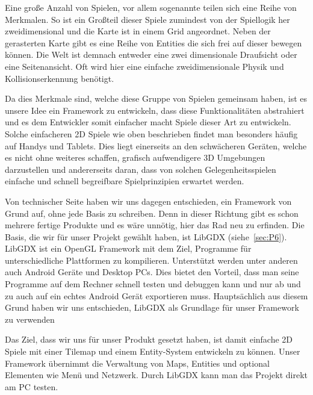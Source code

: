 Eine große Anzahl von Spielen, vor allem sogenannte  teilen sich eine Reihe von Merkmalen.
So ist ein Großteil dieser Spiele zumindest von der Spiellogik her zweidimensional und die Karte ist in einem Grid angeordnet. Neben der gerasterten Karte gibt es eine Reihe von Entities die sich frei auf dieser bewegen können. Die Welt ist demnach entweder eine zwei dimensionale Draufsicht oder eine Seitenansicht. Oft wird hier eine einfache zweidimensionale Physik und Kollisionserkennung benötigt.

Da dies Merkmale sind, welche diese Gruppe von Spielen gemeinsam haben, ist es unsere Idee ein Framework zu entwickeln, dass diese Funktionalitäten abstrahiert und es dem Entwickler somit einfacher macht Spiele dieser Art zu entwickeln.
Solche einfacheren 2D Spiele wie oben beschrieben findet man besonders häufig auf Handys und Tablets. Dies liegt einerseits an den schwächeren Geräten, welche es nicht ohne weiteres schaffen, grafisch aufwendigere 3D Umgebungen darzustellen und andererseits daran, dass von solchen Gelegenheitsspielen einfache und schnell begreifbare Spielprinzipien erwartet werden.

Von technischer Seite haben wir uns dagegen entschieden, ein Framework von Grund auf, ohne jede Basis zu schreiben. Denn in dieser Richtung gibt es schon mehrere fertige Produkte und es wäre unnötig, hier das Rad neu zu erfinden. 
Die Basis, die wir für unser Projekt gewählt haben, ist LibGDX (siehe~\ref{sec:P6}). LibGDX ist ein OpenGL Framework mit dem Ziel, Programme für unterschiedliche Plattformen zu kompilieren. Unterstützt werden unter anderen auch Android Geräte und Desktop PCs. Dies bietet den Vorteil, dass man seine Programme auf dem Rechner schnell testen und debuggen kann und nur ab und zu auch auf ein echtes Android Gerät exportieren muss. Hauptsächlich aus diesem Grund haben wir uns entschieden, LibGDX als Grundlage für unser Framework zu verwenden

Das Ziel, dass wir uns für unser Produkt gesetzt haben, ist damit einfache 2D Spiele mit einer Tilemap und einem Entity-System entwickeln zu können. Unser Framework übernimmt die Verwaltung von Maps, Entities und optional Elementen wie Menü und Netzwerk. Durch LibGDX kann man das Projekt direkt am PC testen.